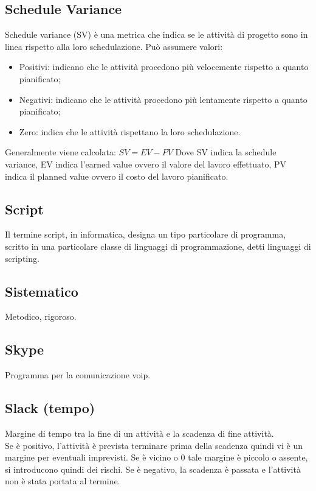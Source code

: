 	\subsection{Schedule Variance}
	\label{sec:schedulevariance}
	Schedule variance (SV) è una metrica che indica se le attività di progetto sono in linea rispetto alla loro schedulazione.
	Può assumere valori:
	\begin{itemize}
	\item Positivi: indicano che le attività procedono più velocemente rispetto a quanto pianificato;
	\item Negativi: indicano che le attività procedono più lentamente rispetto a quanto pianificato;
	\item Zero: indica che le attività rispettano la loro schedulazione.
	\end{itemize}
	Generalmente viene calcolata: $SV = EV - PV$
	Dove SV indica la schedule variance, EV indica l'earned value ovvero il valore del lavoro effettuato, PV indica il planned value ovvero il costo del lavoro pianificato.

	\subsection{Script}
	\label{sec:script}
	Il termine script, in informatica, designa un tipo particolare di programma, scritto in una particolare classe di linguaggi di programmazione, detti linguaggi di scripting.

	\subsection{Sistematico}
	\label{sec:sistematico}
	Metodico, rigoroso.

	\subsection{Skype}
	\label{sec:skype}
	Programma per la comunicazione voip.


	\subsection{Slack (tempo)}
	\label{sec:slackt}
	Margine di tempo tra la fine di un attività e la scadenza di fine attività. \\
	Se è positivo, l'attività è prevista terminare prima della scadenza quindi vi è un margine per eventuali imprevisti. Se è vicino o 0 tale margine è piccolo o assente, si introducono quindi dei rischi. Se è negativo, la scadenza è passata e l'attività non è stata portata al termine.

